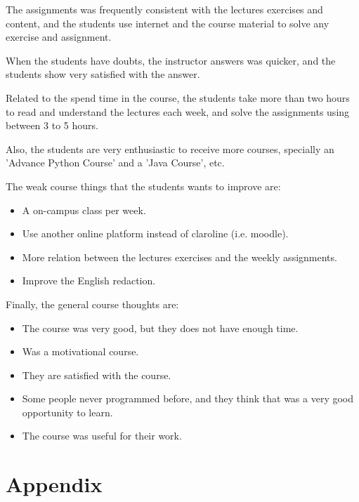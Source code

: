 \documentclass[letter, 10pt]{article}
\begin{document}
The assignments was frequently consistent with the lectures exercises
and content, and the students use internet and the course material
to solve any exercise and assignment.

When the students have doubts, the instructor answers was quicker,
and the students show very satisfied with the answer.

Related to the spend time in the course,
the students take more than two hours to read and understand the lectures
each week, and solve the assignments using between 3 to 5 hours.

Also, the students are very enthusiastic to receive more courses,
specially an 'Advance Python Course' and a 'Java Course', etc.

The weak course things that the students wants to improve are:
\begin{itemize}
    \item A on-campus class per week.
    \item Use another online platform instead of claroline (i.e. moodle).
    \item More relation between the lectures exercises and the weekly assignments.
    \item Improve the English redaction.
\end{itemize}


Finally, the general course thoughts are:

\begin{itemize}
    \item The course was very good, but they does not have enough time.
    \item Was a motivational course.
    \item They are satisfied with the course.
    \item Some people never programmed before, and they think that was a very good opportunity to learn.
    \item The course was useful for their work.
\end{itemize}

\newpage
\section{Appendix}
\end{document}
